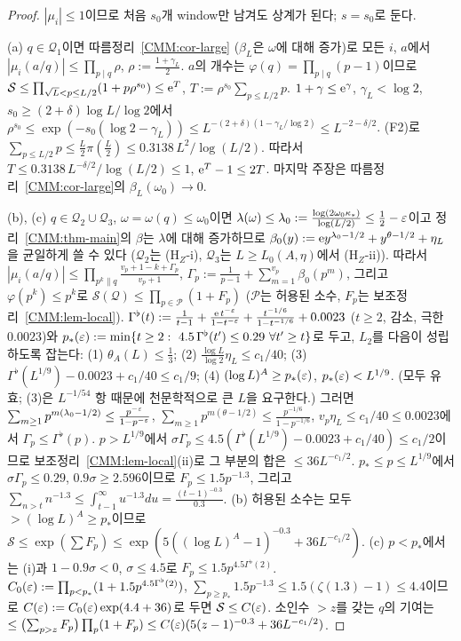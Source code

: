 \begin{proof}
$|\mu_i|\le1$이므로 처음 $s_0$개 window만 남겨도 상계가 된다; $s=s_0$로 둔다.

(a) $q\in\mathcal Q_1$이면 따름정리~\ref{CMM:cor-large} ($\beta_L$은 $\omega$에 대해 증가)로 모든 $i$, $a$에서
$|\mu_i(a/q)|\le\prod_{p\mid q}\rho$, $\rho:=\frac{1+\gamma_L}2$. $a$의 개수는 $\varphi(q)=\prod_{p\mid q}(p-1)$이므로
$\mathcal S\le\prod_{\sqrt L<p\le L/2}(1+p\rho^{s_0})\le\mathrm{e}^T$, $T:=\rho^{s_0}\sum_{p\le L/2}p$.
$1+\gamma\le\mathrm{e}^\gamma$, $\gamma_L<\log2$, $s_0\ge(2+\delta)\log L/\log2$에서
$\rho^{s_0}\le\exp(-s_0(\log2-\gamma_L))\le L^{-(2+\delta)(1-\gamma_L/\log2)}\le L^{-2-\delta/2}$.
(F2)로 $\sum_{p\le L/2}p\le\frac L2\pi(\frac L2)\le0.3138\,L^2/\log(L/2)$. 따라서 $T\le0.3138\,L^{-\delta/2}/\log(L/2)\le1$, $\mathrm{e}^T-1\le2T$.
마지막 주장은 따름정리~\ref{CMM:cor-large}의 $\beta_L(\omega_0)\to0$.

(b), (c) $q\in\mathcal Q_2\cup\mathcal Q_3$, $\omega=\omega(q)\le\omega_0$이면 $\lambda(\omega)\le\lambda_0:=\frac{\log(2\omega_0\kappa_*)}{\log(L/2)}\le\frac12-\varepsilon$이고 정리~\ref{CMM:thm-main}의
$\beta$는 $\lambda$에 대해 증가하므로 $\beta_0(y):=\mathrm{e} y^{\lambda_0-1/2}+y^{\theta-1/2}+\eta_L$을 균일하게 쓸 수 있다
($\mathcal Q_2$는 (H$_Z$-i), $\mathcal Q_3$는 $L\ge L_0(A,\eta)$에서 (H$_Z$-ii)). 따라서
$|\mu_i(a/q)|\le\prod_{p^k\| q}\frac{v_p+1-k+\Gamma_p}{v_p+1}$, $\Gamma_p:=\frac1{p-1}+\sum_{m=1}^{v_p}\beta_0(p^m)$, 그리고
$\varphi(p^k)\le p^k$로 $\mathcal S(\mathcal Q)\le\prod_{p\in\mathcal P}(1+F_p)$ ($\mathcal P$는 허용된 소수, $F_p$는 보조정리~\ref{CMM:lem-local}).
$\Gamma^\flat(t):=\frac1{t-1}+\frac{\mathrm{e}\,t^{-\varepsilon}}{1-t^{-\varepsilon}}+\frac{t^{-1/6}}{1-t^{-1/6}}+0.0023$ ($t\ge2$, 감소, 극한 $0.0023$)와
$p_*(\eps):=\min\{t\ge2:\ 4.5\,\Gamma^\flat(t')\le0.29\ \forall t'\ge t\}$로 두고, $L_2$를 다음이 성립하도록 잡는다:
(1) $\theta_A(L)\le\frac13$; (2) $\frac{\log L}{\log2}\eta_L\le c_1/40$; (3) $\Gamma^\flat(L^{1/9})-0.0023+c_1/40\le c_1/9$; (4) $(\log L)^A\ge p_*(\varepsilon)$, $p_*(\varepsilon)<L^{1/9}$.
(모두 유효; (3)은 $L^{-1/54}$ 항 때문에 천문학적으로 큰 $L$을 요구한다.) 그러면 $\sum_{m\ge1}p^{m(\lambda_0-1/2)}\le\frac{p^{-\varepsilon}}{1-p^{-\varepsilon}}$,
$\sum_{m\ge1}p^{m(\theta-1/2)}\le\frac{p^{-1/6}}{1-p^{-1/6}}$, $v_p\eta_L\le c_1/40\le0.0023$에서 $\Gamma_p\le\Gamma^\flat(p)$.
$p>L^{1/9}$에서 $\sigma\Gamma_p\le4.5(\Gamma^\flat(L^{1/9})-0.0023+c_1/40)\le c_1/2$이므로 보조정리~\ref{CMM:lem-local}(ii)로 그 부분의 합은 $\le36L^{-c_1/2}$.
$p_*\le p\le L^{1/9}$에서 $\sigma\Gamma_p\le0.29$, $0.9\sigma\ge2.596$이므로 $F_p\le1.5p^{-1.3}$, 그리고 $\sum_{n>t}n^{-1.3}\le\int_{t-1}^\infty u^{-1.3}du=\frac{(t-1)^{-0.3}}{0.3}$.
(b) 허용된 소수는 모두 $>(\log L)^A\ge p_*$이므로 $\mathcal S\le\exp(\sum F_p)\le\exp(5((\log L)^A-1)^{-0.3}+36L^{-c_1/2})$.
(c) $p<p_*$에서는 (i)과 $1-0.9\sigma<0$, $\sigma\le4.5$로 $F_p\le1.5p^{4.5\Gamma^\flat(2)}$. $C_0(\varepsilon):=\prod_{p<p_*}(1+1.5p^{4.5\Gamma^\flat(2)})$,
$\sum_{p\ge p_*}1.5p^{-1.3}\le1.5(\zeta(1.3)-1)\le4.4$이므로 $C(\varepsilon):=C_0(\varepsilon)\exp(4.4+36)$로 두면 $\mathcal S\le C(\varepsilon)$. 소인수 $>z$를 갖는 $q$의 기여는
$\le\bigl(\sum_{p>z}F_p\bigr)\prod_{p}(1+F_p)\le C(\varepsilon)(5(z-1)^{-0.3}+36L^{-c_1/2})$.
\end{proof}

